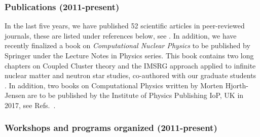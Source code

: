 \subsubsection{Publications (2011-present)}
In the last five years, we have published 52 scientific articles in
peer-reviewed journals, these are listed under references below, see
\cite{Parzuchowski:2016njm,Stroberg:2016ung,Hergert:2015awm,Stroberg:2015ymf,Morris:2015ve,Caceres:2015fk,
  Morris:2014bwa, Konig:2014hma,Hergert:2014vn,Shirokov:2014kqa,Bogner:2014tg,Hergert:2012nb,Bogner:2012zm,Bogner:2011kp,Tsukiyama:2011uq,Tsukiyama:2012fk,Ormand:2016vup,Hagen:2016xjv,Tsunoda:2016fjh,Hagen:2015yea,Osnes:2015mte,Ekstrom:2015rta,Engeland:2014sya,Ekstrom:2014dxa,Vajta:2014wbx,Sanetullaev:2014uya,Balantekin:2014opa,Hagen:2013nca,Hagen:2013yba,Tsunoda:2013bla,Bader:2013npa,Baardsen:2013vwa,Ekstrom:2013kea,Lepailleur:2013bw,Liddick:2013vv,DiJulio:2013gq,Forssen:2012yn,DiJulio:2012fw,DiJulio:2012js,DiJulio:2012gk,Hagen:2012fb,Hagen:2012sh,Torres:2012zz,Torres:2011zz,Tsunoda:2011gh,Bergli:2010tz,Lohne:2010aw,Jensen:2011mv,Jansen:2011gb,Jensen:2010bd,
  Brown:2010ce,Signoracci:2010bz}.  In addition, we have recently
finalized a book on {\em Computational Nuclear Physics} to be published by
Springer under the Lecture Notes in Physics series. This book contains
two long chapters on Coupled Cluster theory and the IMSRG approach
applied to infinite nuclear matter and neutron star studies, co-authored with our graduate students
\cite{lnp}. In addition, two books on Computational Physics written by
Morten Hjorth-Jensen are to be published by the Institute of Physics
Publishing IoP, UK in 2017, see Refs.~\cite{book1mhj, book2mhj}.

\subsubsection{Workshops and programs organized (2011-present)}

